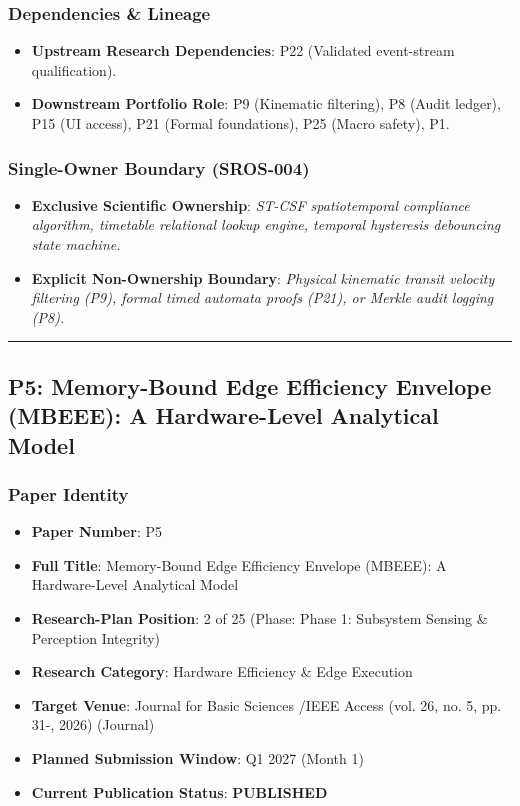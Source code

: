 \documentclass[11pt,letterpaper]{article}
\begin{document}
\subsubsection{Dependencies \& Lineage}
\begin{itemize}[leftmargin=*]
    \item \textbf{Upstream Research Dependencies}: P22 (Validated event-\allowbreak stream qualification).
    \item \textbf{Downstream Portfolio Role}: P9 (Kinematic filtering), P8 (Audit ledger), P15 (UI access), P21 (Formal foundations), P25 (Macro safety), P1.
\end{itemize}

\subsubsection{Single-Owner Boundary (SROS-004)}
\begin{itemize}[leftmargin=*]
    \item \textbf{Exclusive Scientific Ownership}: \textit{ST-\allowbreak CSF spatiotemporal compliance algorithm, timetable relational lookup engine, temporal hysteresis debouncing state machine.}
    \item \textbf{Explicit Non-Ownership Boundary}: \textit{Physical kinematic transit velocity filtering (P9), formal timed automata proofs (P21), or Merkle audit logging (P8).}
\end{itemize}

\vspace{0.4cm}
\hrule

\subsection{P5: Memory-\allowbreak Bound Edge Efficiency Envelope (MBEEE): A Hardware-\allowbreak Level Analytical Model}
\label{sec:profile_p5}

\subsubsection{Paper Identity}
\begin{itemize}[leftmargin=*]
    \item \textbf{Paper Number}: P5
    \item \textbf{Full Title}: Memory-\allowbreak Bound Edge Efficiency Envelope (MBEEE): A Hardware-\allowbreak Level Analytical Model
    \item \textbf{Research-Plan Position}: 2 of 25 (Phase: Phase 1: Subsystem Sensing \& Perception Integrity)
    \item \textbf{Research Category}: Hardware Efficiency \& Edge Execution
    \item \textbf{Target Venue}: Journal for Basic Sciences /\allowbreak  IEEE Access (vol. 26, no. 5, pp. 31-, 2026) (Journal)
    \item \textbf{Planned Submission Window}: Q1 2027 (Month 1)
    \item \textbf{Current Publication Status}: \textbf{PUBLISHED}
\end{itemize}
\end{document}
